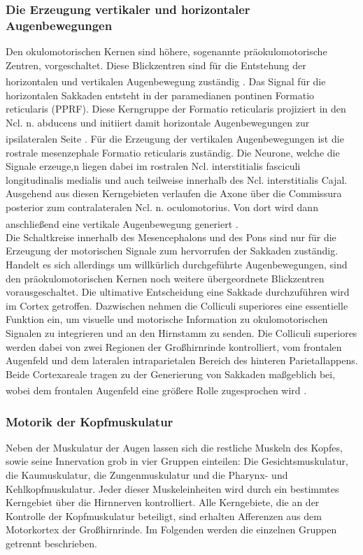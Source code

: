 \documentclass[12pt,a4paper,pdftex]{article}
\begin{document}
\subsubsection*{Die Erzeugung vertikaler und horizontaler Augenbewegungen}
Den okulomotorischen Kernen sind höhere, sogenannte präokulomotorische Zentren, vorgeschaltet. Diese Blickzentren sind für die Entstehung der horizontalen und vertikalen Augenbewegung zuständig \textsuperscript{\cite[6]{trepel2011neuroanatomie}}.   
Das Signal für die horizontalen Sakkaden entsteht in der paramedianen pontinen Formatio reticularis (PPRF). Diese Kerngruppe der Formatio reticularis projiziert in den Ncl. n. abducens und initiiert damit horizontale Augenbewegungen zur ipsilateralen Seite \textsuperscript{\cite[39]{kandel2013principles}}. Für die Erzeugung der vertikalen Augenbewegungen ist die rostrale mesenzephale Formatio reticularis zuständig. Die Neurone, welche die Signale erzeuge,n liegen dabei im rostralen Ncl. interstitialis fasciculi longitudinalis medialis und auch teilweise innerhalb des Ncl. interstitialis Cajal. Ausgehend aus diesen Kerngebieten verlaufen die Axone über die Commissura posterior zum contralateralen Ncl. n. oculomotorius. Von dort wird dann anschließend eine vertikale Augenbewegung generiert
\textsuperscript{\cite[6]{trepel2011neuroanatomie}}. \\      
Die Schaltkreise innerhalb des Mesencephalons und des Pons sind nur für die Erzeugung der motorischen Signale zum hervorrufen der Sakkaden zuständig. Handelt es sich allerdings um willkürlich durchgeführte Augenbewegungen, sind den präokulomotorischen Kernen noch weitere übergeordnete Blickzentren vorausgeschaltet. Die ultimative Entscheidung eine Sakkade durchzuführen wird im Cortex getroffen. Dazwischen nehmen die Colliculi superiores eine essentielle Funktion ein, um visuelle und motorische Information zu okulomotorischen Signalen zu integrieren und an den Hirnstamm zu senden. Die Colliculi superiores werden dabei von zwei Regionen der Großhirnrinde kontrolliert, vom frontalen Augenfeld und dem lateralen intraparietalen Bereich des hinteren Parietallappens. Beide Cortexareale tragen zu der Generierung von Sakkaden maßgeblich bei, wobei dem frontalen Augenfeld eine größere Rolle zugesprochen wird \textsuperscript{\cite[39]{kandel2013principles}}.             

\subsubsection{Motorik der Kopfmuskulatur} 
Neben der Muskulatur der Augen lassen sich die restliche Muskeln des Kopfes, sowie seine Innervation grob in vier Gruppen einteilen: Die Gesichtsmuskulatur, die Kaumuskulatur, die Zungenmuskulatur und die Pharynx- und Kehlkopfmuskulatur. Jeder dieser Muskeleinheiten wird durch ein bestimmtes Kerngebiet über die Hirnnerven kontrolliert. Alle Kerngebiete, die an der Kontrolle der Kopfmuskulatur beteiligt, sind erhalten Afferenzen aus dem Motorkortex der Großhirnrinde. Im Folgenden werden die einzelnen Gruppen getrennt beschrieben.
\end{document}
